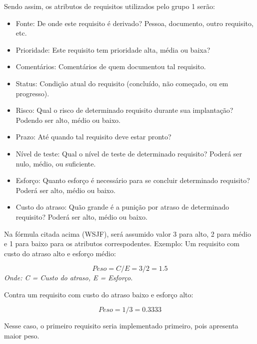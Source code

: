 Sendo assim, os atributos de requisitos utilizados pelo grupo 1 serão:
\begin{itemize}
  \item Fonte: De onde este requisito é derivado? Pessoa, documento, outro requisito, etc.
  \item Prioridade: Este requisito tem prioridade alta, média ou baixa?
  \item Comentários: Comentários de quem documentou tal requisito.
  \item Status: Condição atual do requisito (concluído, não começado, ou em progresso).
  \item Risco: Qual o risco de determinado requisito durante sua implantação? Podendo ser alto, médio ou baixo.
  \item Prazo: Até quando tal requisito deve estar pronto?
  \item Nível de teste: Qual o nível de teste de determinado requisito? Poderá ser nulo, médio, ou suficiente.
  \item Esforço: Quanto esforço é necessário para se concluir determinado requisito? Poderá ser alto, médio ou baixo.
  \item Custo do atraso: Quão grande é a punição por atraso de determinado requisito? Poderá ser alto, médio ou baixo.
\end{itemize}

Na fórmula citada acima (WSJF), será assumido valor 3 para alto, 2 para médio e 1 para baixo para os atributos correspodentes. Exemplo: Um requisito com custo do atraso alto e esforço médio:

\begin{equation}
  Peso = C / E = 3/2 = 1.5
\end{equation}
  \emph{Onde: C = Custo do atraso, E = Esforço.}

Contra um requisito com custo do atraso baixo e esforço alto:

\begin{equation}
  Peso = 1/3 = 0.3333
\end{equation}

Nesse caso, o primeiro requisito seria implementado primeiro, pois apresenta maior peso.
